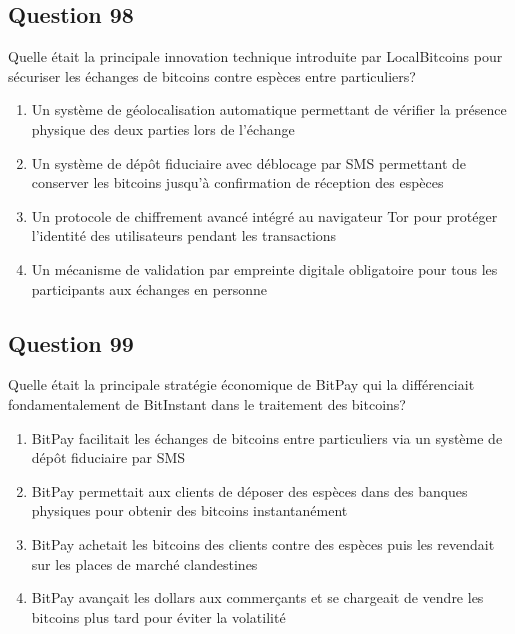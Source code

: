 \documentclass[12pt,a4paper]{article}
\begin{document}
\bigskip


\subsection*{Question 98}
Quelle était la principale innovation technique introduite par LocalBitcoins pour sécuriser les échanges de bitcoins contre espèces entre particuliers?

\begin{enumerate}[label=\Alph*., leftmargin=*]
\item Un système de géolocalisation automatique permettant de vérifier la présence physique des deux parties lors de l'échange
\item Un système de dépôt fiduciaire avec déblocage par SMS permettant de conserver les bitcoins jusqu'à confirmation de réception des espèces
\item Un protocole de chiffrement avancé intégré au navigateur Tor pour protéger l'identité des utilisateurs pendant les transactions
\item Un mécanisme de validation par empreinte digitale obligatoire pour tous les participants aux échanges en personne
\end{enumerate}

\bigskip


\subsection*{Question 99}
Quelle était la principale stratégie économique de BitPay qui la différenciait fondamentalement de BitInstant dans le traitement des bitcoins?

\begin{enumerate}[label=\Alph*., leftmargin=*]
\item BitPay facilitait les échanges de bitcoins entre particuliers via un système de dépôt fiduciaire par SMS
\item BitPay permettait aux clients de déposer des espèces dans des banques physiques pour obtenir des bitcoins instantanément
\item BitPay achetait les bitcoins des clients contre des espèces puis les revendait sur les places de marché clandestines
\item BitPay avançait les dollars aux commerçants et se chargeait de vendre les bitcoins plus tard pour éviter la volatilité
\end{enumerate}

\bigskip
\end{document}
